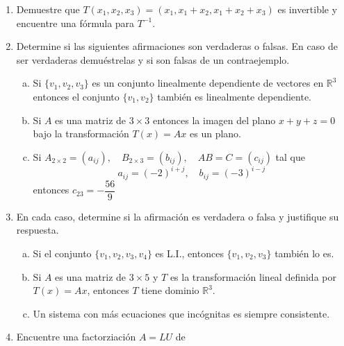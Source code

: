 \documentclass[12pt]{article}
\newenvironment{preguntas}
{\begin{enumerate}\itemsep12pt
	}
	{
	\end{enumerate}
}
\newcommand{\R}{\mathbb{R}}
\begin{document}
\begin{preguntas}
$$\begin{array}{r}
  1\\-2\\4
\end{array}\right)= \left(\begin{array}{r}
  1\\0\\1
\end{array}\right), \qquad  A\left(\begin{array}{r}
  -1\\1\\1
\end{array}\right)= \left(\begin{array}{r}
  0\\1\\1
\end{array}\right).$$ Calcule $A^{-1}$.
\item Demuestre que $T(x_1,x_2, x_3)=(x_1,x_1+x_2, x_1+x_2+x_3)$ es invertible y encuentre una f\'ormula para $T^{-1}$.
\item Determine si las siguientes afirmaciones son verdaderas o falsas. En caso de ser verdaderas demuéstrelas y si son falsas de un contraejemplo.
\begin{enumerate}[a)]
\item Si $\{v_1, v_2, v_3\}$ es un conjunto linealmente dependiente de vectores en $\R^3$ entonces el conjunto $\{v_1, v_2\}$ también es linealmente dependiente.
\item Si $A$ es una matriz de $3 \times 3$ entonces la imagen del plano $x+y+z=0$ bajo la transformación $T(x)=Ax$ es un plano.
\item Si $A_{2\times 2} = (a_{ij}), \quad B_{2\times 3} = (b_{ij}), \quad AB = C = (c_{ij})$ tal que
$$a_{ij} = (-2)^{i+j}, \quad b_{ij} = (-3)^{i-j}$$
entonces $c_{23} = -\dfrac{56}{9}$
\end{enumerate}
\item En cada caso, determine si la afirmación es verdadera o falsa y justifique su respuesta.
\begin{enumerate}[a)]
\item Si el conjunto $\{v_1, v_2, v_3, v_4\}$ es L.I., entonces $\{v_1, v_2, v_3\}$ también lo es.
\item Si $A$ es una matriz de $3\times 5$ y $T$ es la transformación lineal definida por $T(x) = Ax$, entonces $T$ tiene dominio $\R^3$.
\item Un sistema con más ecuaciones que incógnitas es siempre consistente.
\end{enumerate}
\item Encuentre una factorziación $A = LU$ de

\end{preguntas}
\end{document}
